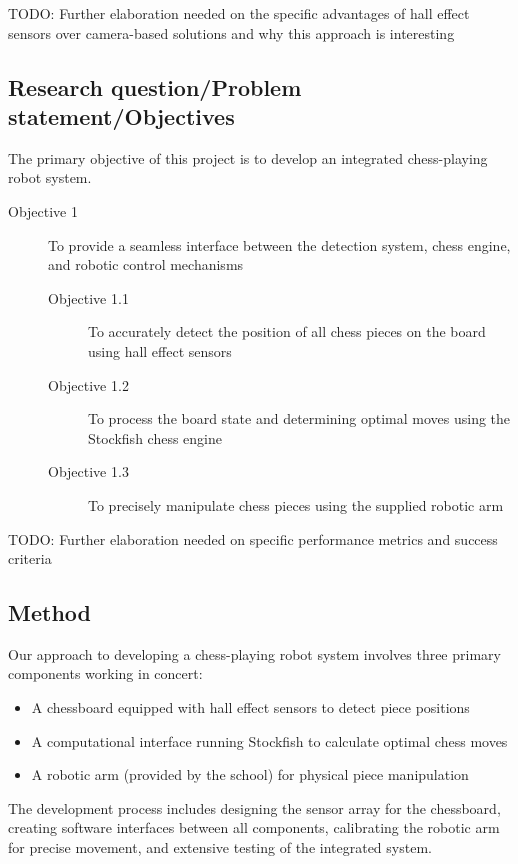 TODO: Further elaboration needed on the specific advantages of hall effect sensors over camera-based solutions and why this approach is interesting

\subsection{Research question/Problem statement/Objectives}
\label{sec:research-question}

The primary objective of this project is to develop an integrated chess-playing robot system.
\begin{description}
  \item[Objective 1] To provide a seamless interface between the detection system, chess engine, and robotic control mechanisms
        \begin{description}
          \item[Objective 1.1] To accurately detect the position of all chess pieces on the board using hall effect sensors
          \item[Objective 1.2] To process the board state and determining optimal moves using the Stockfish chess engine
          \item[Objective 1.3] To precisely manipulate chess pieces using the supplied robotic arm
        \end{description}
\end{description}

TODO: Further elaboration needed on specific performance metrics and success criteria

\subsection{Method}
\label{sec:method}

Our approach to developing a chess-playing robot system involves three primary components working in concert:
\begin{itemize}
  \item A chessboard equipped with hall effect sensors to detect piece positions
  \item A computational interface running Stockfish to calculate optimal chess moves
  \item A robotic arm (provided by the school) for physical piece manipulation
\end{itemize}

The development process includes designing the sensor array for the chessboard, creating software interfaces between all components, calibrating the robotic arm for precise movement, and extensive testing of the integrated system.

